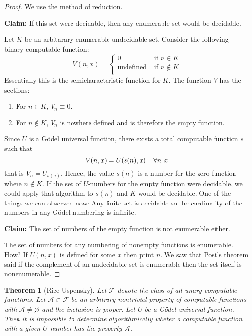 \documentclass[10pt, letterpaper]{article}
\newtheorem{thm}{Theorem}
\theoremstyle{remark}
\theoremstyle{definition}
\begin{document}
\begin{proof}
    We use the method of reduction.

    \textbf{Claim:} If this set were decidable, then any enumerable set would be decidable.

    Let $K$ be an arbitarary enumerable undecidable set. Consider the following binary computable function:
    \[
        V(n,x) = \begin{cases}
            0 &\text{ if } n \in K \\
            \text{undefined} &\text{ if } n \notin K \\
        \end{cases}
    \]
    Essentially this is the semicharacteristic function for $K$. The function $V$ has the sections:
    \begin{enumerate}
        \item For $n \in K$, $V_n \equiv 0$.
        \item For $n \notin K$, $V_n$ is nowhere defined and is therefore the empty function.
    \end{enumerate}
    Since $U$ is a G\"{o}del universal function, there exists a total computable function $s$ such that 
    \[
        V(n,x) = U(s(n), x) \hspace*{.15in} \forall n,x
    \]
    that is $V_n = U_{s(n)}$. Hence, the value $s(n)$ is a number for the zero function where $n \notin K$. If the set of $U$-numbers 
    for the empty function were decidable, we could apply that algorithm to $s(n)$ and $K$ would be decidable. One of the things we 
    can observed now: Any finite set is decidable so the cardinality of the numbers in any G\"{o}del numbering is infinite.

    \textbf{Claim: } The set of numbers of the empty function is not enumerable either.

    The set of numbers for any numbering of nonempty functions is enumerable. How? If $U(n,x)$ is defined for some $x$ then print $n$. We saw 
    that Post's theorem said if the complement of an undecidable set is enumerable then the set itself is nonenumerable.
\end{proof}

\begin{thm}[Rice-Uspensky]
    Let $\mathscr{F}$ denote the class of all unary computable functions. Let $\mathscr{A} \subset \mathscr{F}$ be an arbitrary 
    nontrivial property of computable functions with $\mathscr{A} \neq \varnothing$ and the inclusion is proper. Let $U$ be a G\"{o}del universal 
    function. Then it is impossible to determine algorithmically wheter a computable function with a given $U$-number has the property $\mathscr{A}$.

\end{thm}
\end{document}
